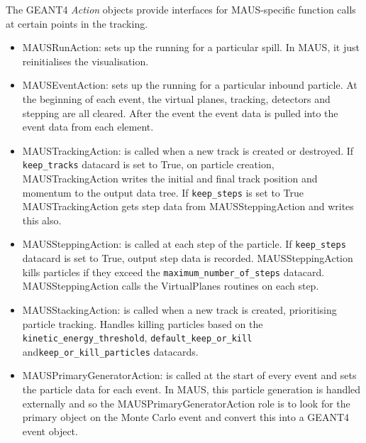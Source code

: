 The GEANT4 \emph{Action} objects provide interfaces for MAUS-specific function calls at certain points in the tracking.

\begin{itemize}
\item MAUSRunAction: sets up the running for a particular spill. In MAUS, it just reinitialises the visualisation.
\item MAUSEventAction: sets up the running for a particular inbound particle. At the beginning of each event, the virtual planes, tracking, detectors and stepping are all cleared. After the event the event data is pulled into the event data from each element.
\item MAUSTrackingAction: is called when a new track is created or destroyed. If \verb|keep_tracks| datacard is set to True, on particle creation, MAUSTrackingAction writes the initial and final track position and momentum to the output data tree. If \verb|keep_steps| is set to True MAUSTrackingAction gets step data from MAUSSteppingAction and writes this also.
\item MAUSSteppingAction: is called at each step of the particle. If \verb|keep_steps| datacard is set to True, output step data is recorded. MAUSSteppingAction kills particles if they exceed the \verb|maximum_number_of_steps| datacard. MAUSSteppingAction calls the VirtualPlanes routines on each step.
\item MAUSStackingAction: is called when a new track is created, prioritising particle tracking. Handles killing particles based on the \verb|kinetic_energy_threshold|, \verb|default_keep_or_kill| and\linebreak\verb|keep_or_kill_particles| datacards.
\item MAUSPrimaryGeneratorAction: is called at the start of every event and sets the particle data for each event. In MAUS, this particle generation is handled externally and so the MAUSPrimaryGeneratorAction role is to look for the primary object on the Monte Carlo event and convert this into a GEANT4 event object.
\end{itemize}

